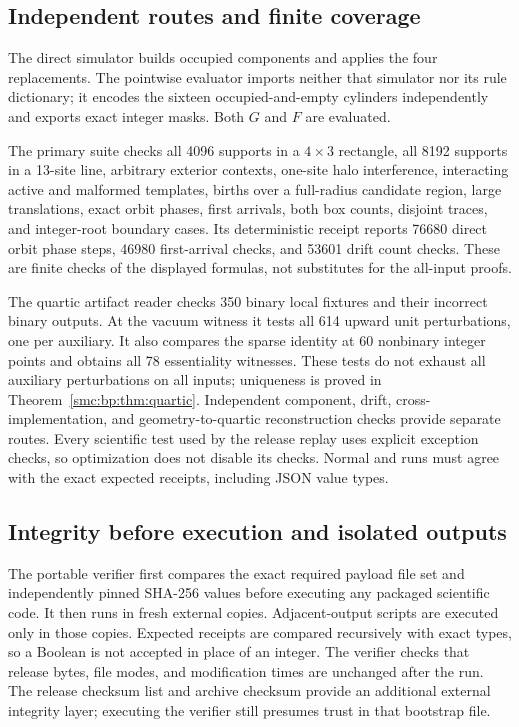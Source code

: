 \documentclass[11pt,letterpaper]{article}
\numberwithin{equation}{section}
\theoremstyle{definition}
\theoremstyle{remark}
\newcommand{\file}[1]{\texttt{\detokenize{#1}}}
\begin{document}
\subsection{Independent routes and finite coverage}
The direct simulator \file{component_rule.py} builds occupied components and applies the four replacements. The pointwise evaluator \file{local_rule.py} imports neither that simulator nor its rule dictionary; it encodes the sixteen occupied-and-empty cylinders independently and exports exact integer masks. Both $G$ and $F$ are evaluated.

The primary suite checks all 4096 supports in a $4\times3$ rectangle, all 8192 supports in a 13-site line, arbitrary exterior contexts, one-site halo interference, interacting active and malformed templates, births over a full-radius candidate region, large translations, exact orbit phases, first arrivals, both box counts, disjoint traces, and integer-root boundary cases. Its deterministic receipt reports 76680 direct orbit phase steps, 46980 first-arrival checks, and 53601 drift count checks. These are finite checks of the displayed formulas, not substitutes for the all-input proofs.

The quartic artifact reader checks 350 binary local fixtures and their incorrect binary outputs. At the vacuum witness it tests all 614 upward unit perturbations, one per auxiliary. It also compares the sparse identity at 60 nonbinary integer points and obtains all 78 essentiality witnesses. These tests do not exhaust all auxiliary perturbations on all inputs; uniqueness is proved in Theorem~\ref{smc:bp:thm:quartic}. Independent component, drift, cross-implementation, and geometry-to-quartic reconstruction checks provide separate routes. Every scientific test used by the release replay uses explicit exception checks, so optimization does not disable its checks. Normal and \file{-O} runs must agree with the exact expected receipts, including JSON value types.

\subsection{Integrity before execution and isolated outputs}
The portable verifier first compares the exact required payload file set and independently pinned SHA-256 values before executing any packaged scientific code. It then runs in fresh external copies. Adjacent-output scripts are executed only in those copies. Expected receipts are compared recursively with exact types, so a Boolean is not accepted in place of an integer. The verifier checks that release bytes, file modes, and modification times are unchanged after the run. The release checksum list and archive checksum provide an additional external integrity layer; executing the verifier still presumes trust in that bootstrap file.
\end{document}

